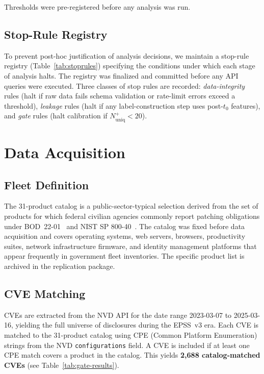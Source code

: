 \documentclass[conference]{IEEEtran}
\begin{document}
Thresholds were pre-registered before any analysis was run.

\subsection{Stop-Rule Registry}
\label{subsec:stoprule}

To prevent post-hoc justification of analysis decisions, we maintain a
stop-rule registry (Table~\ref{tab:stoprules}) specifying the conditions
under which each stage of analysis halts. The registry was finalized and
committed before any API queries were executed. Three classes of stop
rules are recorded: \emph{data-integrity} rules (halt if raw data fails
schema validation or rate-limit errors exceed a threshold), \emph{leakage}
rules (halt if any label-construction step uses post-$t_0$ features), and
\emph{gate} rules (halt calibration if $N^+_{\text{uniq}} < 20$).

\section{Data Acquisition}
\label{sec:data}

\subsection{Fleet Definition}

The 31-product catalog is a public-sector-typical selection derived from
the set of products for which federal civilian agencies commonly report
patching obligations under BOD~22-01~\cite{cisa_bod2201} and NIST SP
800-40~\cite{nist80040r4}. The catalog was fixed before data acquisition
and covers operating systems, web servers, browsers, productivity suites,
network infrastructure firmware, and identity management platforms that
appear frequently in government fleet inventories. The specific product
list is archived in the replication package.

\subsection{CVE Matching}

CVEs are extracted from the NVD API for the date range 2023-03-07 to
2025-03-16, yielding the full universe of disclosures during the
EPSS~v3 era. Each CVE is matched to the 31-product catalog using CPE
(Common Platform Enumeration) strings from the NVD \texttt{configurations}
field. A CVE is included if at least one CPE match covers a product in the
catalog. This yields \textbf{2,688 catalog-matched CVEs} (see
Table~\ref{tab:gate-results}).
\end{document}
